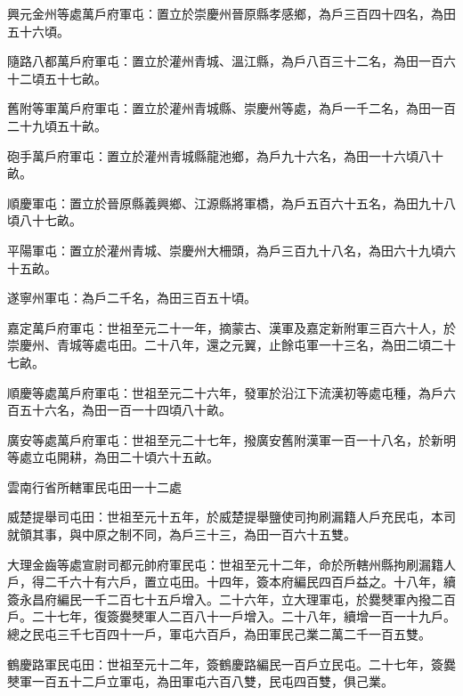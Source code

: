 \begin{pinyinscope}
 興元金州等處萬戶府軍屯：置立於崇慶州晉原縣孝感鄉，為戶三百四十四名，為田五十六頃。



 隨路八都萬戶府軍屯：置立於灌州青城、溫江縣，為戶八百三十二名，為田一百六十二頃五十七畝。



 舊附等軍萬戶府軍屯：置立於灌州青城縣、崇慶州等處，為戶一千二名，為田一百二十九頃五十畝。



 砲手萬戶府軍屯：置立於灌州青城縣龍池鄉，為戶九十六名，為田一十六頃八十畝。



 順慶軍屯：置立於晉原縣義興鄉、江源縣將軍橋，為戶五百六十五名，為田九十八頃八十七畝。



 平陽軍屯：置立於灌州青城、崇慶州大柵頭，為戶三百九十八名，為田六十九頃六十五畝。



 遂寧州軍屯：為戶二千名，為田三百五十頃。



 嘉定萬戶府軍屯：世祖至元二十一年，摘蒙古、漢軍及嘉定新附軍三百六十人，於崇慶州、青城等處屯田。二十八年，還之元翼，止餘屯軍一十三名，為田二頃二十七畝。



 順慶等處萬戶府軍屯：世祖至元二十六年，發軍於沿江下流漢初等處屯種，為戶六百五十六名，為田一百一十四頃八十畝。



 廣安等處萬戶府軍屯：世祖至元二十七年，撥廣安舊附漢軍一百一十八名，於新明等處立屯開耕，為田二十頃六十五畝。



 雲南行省所轄軍民屯田一十二處



 威楚提舉司屯田：世祖至元十五年，於威楚提舉鹽使司拘刷漏籍人戶充民屯，本司就領其事，與中原之制不同，為戶三十三，為田一百六十五雙。



 大理金齒等處宣尉司都元帥府軍民屯：世祖至元十二年，命於所轄州縣拘刷漏籍人戶，得二千六十有六戶，置立屯田。十四年，簽本府編民四百戶益之。十八年，續簽永昌府編民一千二百七十五戶增入。二十六年，立大理軍屯，於爨僰軍內撥二百戶。二十七年，復簽爨僰軍人二百八十一戶增入。二十八年，續增一百一十九戶。總之民屯三千七百四十一戶，軍屯六百戶，為田軍民己業二萬二千一百五雙。



 鶴慶路軍民屯田：世祖至元十二年，簽鶴慶路編民一百戶立民屯。二十七年，簽爨僰軍一百五十二戶立軍屯，為田軍屯六百八雙，民屯四百雙，俱己業。




\end{pinyinscope}
